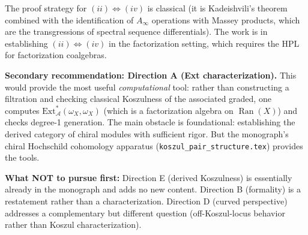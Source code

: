 \documentclass[11pt]{article}
\theoremstyle{remark}
\newcommand{\cA}{\mathcal{A}}
\newcommand{\Ext}{\mathrm{Ext}}
\newcommand{\Ran}{\operatorname{Ran}}
\begin{document}
The proof strategy for $(ii) \Leftrightarrow (iv)$ is classical (it is Kadeishvili's theorem combined with the identification of $A_\infty$ operations with Massey products, which are the transgressions of spectral sequence differentials).  The work is in establishing $(ii) \Leftrightarrow (iv)$ in the factorization setting, which requires the HPL for factorization coalgebras.

\textbf{Secondary recommendation: Direction A (Ext characterization).}  This would provide the most useful \emph{computational} tool: rather than constructing a filtration and checking classical Koszulness of the associated graded, one computes $\Ext^*_\cA(\omega_X, \omega_X)$ (which is a factorization algebra on $\Ran(X)$) and checks degree-1 generation.  The main obstacle is foundational: establishing the derived category of chiral modules with sufficient rigor.  But the monograph's chiral Hochschild cohomology apparatus (\texttt{koszul\_pair\_structure.tex}) provides the tools.

\textbf{What NOT to pursue first:}  Direction E (derived Koszulness) is essentially already in the monograph and adds no new content.  Direction B (formality) is a restatement rather than a characterization.  Direction D (curved perspective) addresses a complementary but different question (off-Koszul-locus behavior rather than Koszul characterization).
\end{document}
